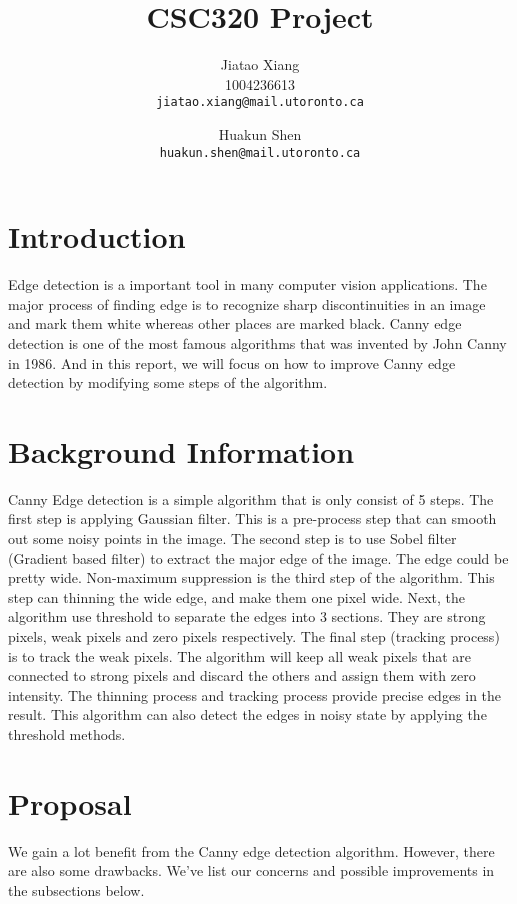 \documentclass[10pt,twocolumn,letterpaper]{article}
\begin{document}
\title{CSC320 Project}

\author{Jiatao Xiang\\
1004236613\\
{\tt\small jiatao.xiang@mail.utoronto.ca}
\and
Huakun Shen\\
{\tt\small huakun.shen@mail.utoronto.ca}
}

\maketitle


\section{Introduction}
Edge detection is a important tool in many computer vision applications. The major process of finding edge is to recognize sharp discontinuities in an image and mark them white whereas other places are marked black. Canny edge detection is one of the most famous algorithms that was invented by John Canny in 1986. And in this report, we will focus on how to improve Canny edge detection by modifying some steps of the algorithm.\\


\section{Background Information}
Canny Edge detection is a simple algorithm that is only consist of 5 steps. The first step is applying Gaussian filter. This is a pre-process step that can smooth out some noisy points in the image. The second step is to use Sobel filter (Gradient based filter) to extract the major edge of the image. The edge could be pretty wide. Non-maximum suppression is the third step of the algorithm. This step can thinning the wide edge, and make them one pixel wide. Next, the algorithm use threshold to separate the edges into 3 sections. They are strong pixels, weak pixels and zero pixels respectively. The final step (tracking process) is to track the weak pixels. The algorithm will keep all weak pixels that are connected to strong pixels and discard the others and assign them with zero intensity. The thinning process and tracking process provide precise edges in the result. This algorithm can also detect the edges in noisy state by applying the threshold methods.

\section{Proposal}
We gain a lot benefit from the Canny edge detection algorithm. However, there are also some drawbacks. We've list our concerns and possible improvements in the subsections below.
\end{document}
